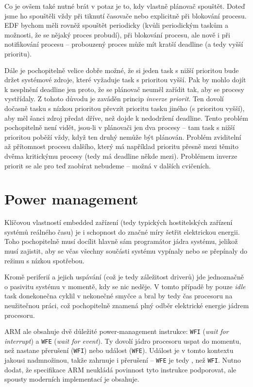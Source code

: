 \documentclass{article}
\begin{document}
Co je ovšem také nutné brát v potaz je to, kdy vlastně plánovač spouštět. Doteď jsme ho spouštěli vždy při tiknutí časovače nebo explicitně při blokování procesu. EDF bychom měli rovněž spouštět periodicky (kvůli periodickým taskům a možnosti, že se nějaký proces probudí), při blokování procesu, ale nově i při notifikování procesu -- probouzený proces může mít kratší deadline (a tedy vyšší prioritu).

Dále je pochopitelně velice dobře možné, že si jeden task s nižší prioritou bude držet systémové zdroje, které vyžaduje task s prioritou vyšší. Pak by mohlo dojít k nesplnění deadline jen proto, že se plánovač neuměl zařídit tak, aby se procesy vystřídaly. Z tohoto důvodu je zaváděn princip \emph{inverze priorit}. Ten dovolí dočasně tasku s nízkou prioritou převzít prioritu tasku jiného (s prioritou vyšší), aby měl šanci zdroj předat dříve, než dojde k nedodržení deadline. Tento problém pochopitelně není vidět, jsou-li v plánovači jen dva procesy -- tam task s nižší prioritou poběží vždy, když ten druhý nemůže být plánován. Problém zviditelní až přítomnost procesu dalšího, který má například prioritu přesně mezi těmito dvěma kritickýmu procesy (tedy má deadline někde mezi). Problémem inverze priorit se ale pro teď zaobírat nebudeme -- možná v dalších cvičeních.


\section{Power management}

Klíčovou vlastností embedded zařízení (tedy typických hostitelských zařízení systémů reálného času) je i schopnost do značné míry šetřit elektrickou energii. Toho pochopitelně musí docílit hlavně sám programátor jádra systému, jelikož musí zajistit, aby se včas všechny součásti systému vypínaly nebo se přepínaly do režimu s nízkou spotřebou.

Kromě periferií a jejich uspávání (což je tedy záležitost driverů) jde jednoznačně o pasivitu systému v momentě, kdy se nic neděje. V tomto případě by pouze \emph{idle} task donekonečna cyklil v nekonečné smyčce a bral by tedy čas procesoru na neužitečnou práci, což pochopitelně znamená plný odběr elektrické energie jádrem procesoru.

ARM ale obsahuje dvě důležité power-management instrukce: \texttt{WFI} (\emph{wait for interrupt}) a \texttt{WFE} (\emph{wait for event}). Ty dovolí jádro procesoru uspat do momentu, než nastane přerušení (\texttt{WFI}) nebo událost (\texttt{WFE}). Událost je v tomto kontextu jakousi nadmnožinou, takže zahrnuje i přerušení -- \texttt{WFE} je tedy , než \texttt{WFI}. Nutno dodat, že specifikace ARM neukládá povinnost tyto instrukce podporovat, ale spousty moderních implementací je obsahuje.
\end{document}
